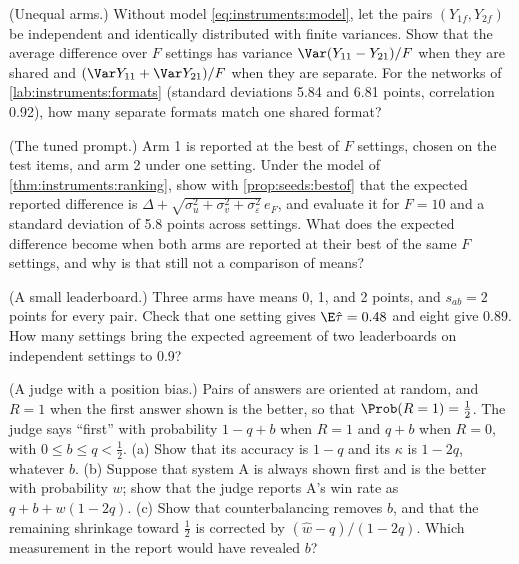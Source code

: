 \begin{refsection}
\begin{exercises}
\item \consolidation (Unequal arms.) Without model \eqref{eq:instruments:model}, let the pairs $(Y_{1f},Y_{2f})$ be independent and identically distributed with finite variances. Show that the average difference over $F$ settings has variance $\Var(Y_{11}-Y_{21})/F$ when they are shared and $(\Var Y_{11}+\Var Y_{21})/F$ when they are separate. For the networks of \cref{lab:instruments:formats} (standard deviations 5.84 and 6.81 points, correlation 0.92), how many separate formats match one shared format?\label{ex:instruments:unequal}

\item \consolidation (The tuned prompt.) Arm 1 is reported at the best of $F$ settings, chosen on the test items, and arm 2 under one setting. Under the model of \cref{thm:instruments:ranking}, show with \cref{prop:seeds:bestof} that the expected reported difference is $\Delta+\sqrt{\sigma_u^2+\sigma_v^2+\sigma_\varepsilon^2}\,e_F$, and evaluate it for $F=10$ and a standard deviation of 5.8 points across settings. What does the expected difference become when both arms are reported at their best of the same $F$ settings, and why is that still not a comparison of means?\label{ex:instruments:tuned}

\item \consolidation (A small leaderboard.) Three arms have means 0, 1, and 2 points, and $s_{ab}=2$ points for every pair. Check that one setting gives $\E\hat\tau=0.48$ and eight give 0.89. How many settings bring the expected agreement of two leaderboards on independent settings to 0.9?\label{ex:instruments:three}

\item \consolidation\hard (A judge with a position bias.) Pairs of answers are oriented at random, and $R=1$ when the first answer shown is the better, so that $\Prob(R=1)=\frac12$. The judge says \enquote{first} with probability $1-q+b$ when $R=1$ and $q+b$ when $R=0$, with $0\le b\le q<\frac12$. (a) Show that its accuracy is $1-q$ and its $\kappa$ is $1-2q$, whatever $b$. (b) Suppose that system A is always shown first and is the better with probability $w$; show that the judge reports A's win rate as $q+b+w(1-2q)$. (c) Show that counterbalancing removes $b$, and that the remaining shrinkage toward $\frac12$ is corrected by $(\hat w-q)/(1-2q)$. Which measurement in the report would have revealed $b$? \label{ex:instruments:position}


\end{exercises}
\end{refsection}
